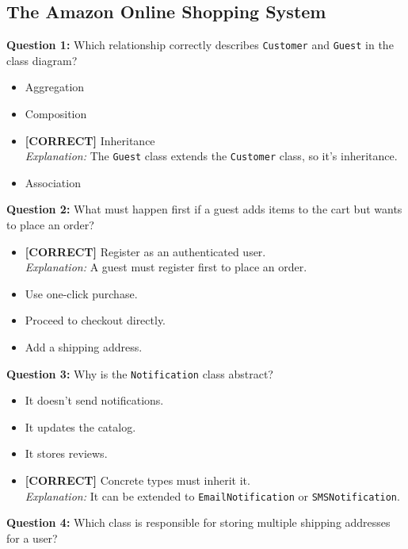 \subsection*{The Amazon Online Shopping System}
\vspace{0.3cm}
\noindent
\textbf{Question 1:} Which relationship correctly describes \texttt{Customer} and \texttt{Guest} in the class diagram?
\\[0.2cm]
\begin{itemize}
 \item Aggregation
 \item Composition
 \item \textbf{[CORRECT]} Inheritance
\\[0.1cm]
\textit{Explanation:} 
The \texttt{Guest} class extends the \texttt{Customer} class, so it's inheritance.
 \item Association
\end{itemize}
\vspace{0.3cm}
\noindent
\textbf{Question 2:} What must happen first if a guest adds items to the cart but wants to place an order?
\\[0.2cm]
\begin{itemize}
 \item \textbf{[CORRECT]} Register as an authenticated user.
\\[0.1cm]
\textit{Explanation:} 
A guest must register first to place an order.
 \item Use one-click purchase.
 \item Proceed to checkout directly.
 \item Add a shipping address.
\end{itemize}
\vspace{0.3cm}
\noindent
\textbf{Question 3:} Why is the \texttt{Notification} class abstract?
\\[0.2cm]
\begin{itemize}
 \item It doesn't send notifications.
 \item It updates the catalog.
 \item It stores reviews.
 \item \textbf{[CORRECT]} Concrete types must inherit it.
\\[0.1cm]
\textit{Explanation:} 
It can be extended to \texttt{EmailNotification} or \texttt{SMSNotification}.
\end{itemize}
\vspace{0.3cm}
\noindent
\textbf{Question 4:} Which class is responsible for storing multiple shipping addresses for a user?
